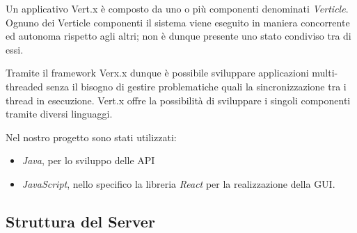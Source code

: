 \noindent Un applicativo Vert.x è composto da uno o più componenti denominati \emph{Verticle}.\newline
Ognuno dei Verticle componenti il sistema viene eseguito in maniera
concorrente ed autonoma rispetto agli altri; non è dunque presente uno stato condiviso tra di essi.\newline

\noindent Tramite il framework Verx.x dunque è possibile sviluppare applicazioni multi-threaded senza il bisogno di gestire problematiche quali la sincronizzazione tra i thread in esecuzione.
\noindent
Vert.x offre la possibilità di sviluppare i singoli componenti tramite diversi linguaggi.\newline

\noindent Nel nostro progetto sono stati utilizzati:
\begin{itemize}
    \item {\emph{Java}, per lo sviluppo delle API}
    \item{\emph{JavaScript}, nello specifico la libreria \emph{React} per la realizzazione della GUI.}
\end{itemize}

\subsection{Struttura del Server}

